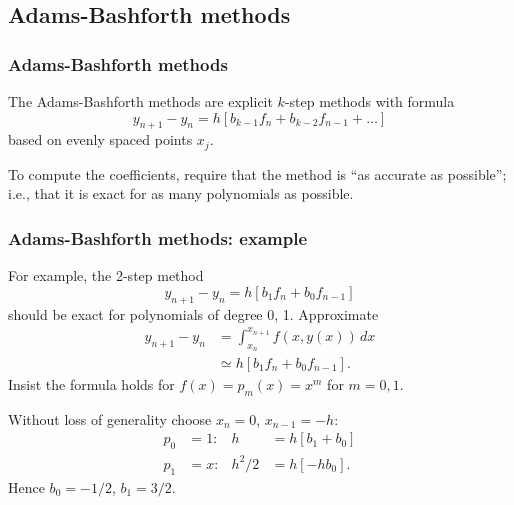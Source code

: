 \documentclass{beamer}
\begin{document}
\subsection{Adams-Bashforth methods}

\begin{frame}
  \frametitle{Adams-Bashforth methods}

  The Adams-Bashforth methods are explicit $k$-step methods
  with formula
  \begin{equation*}
    y_{n+1} - y_n = h \left[ b_{k-1} f_n + b_{k-2} f_{n-1} + \dots \right]
  \end{equation*}
  based on evenly spaced points $x_j$. \pause

  \vspace{1ex}

  To compute the coefficients, require that the method is ``as
  accurate as possible''; i.e., that it is exact for as many
  polynomials as possible.

\end{frame}

\begin{frame}
  \frametitle{Adams-Bashforth methods: example}

  For example, the 2-step method
  \begin{equation*}
    y_{n+1} - y_n = h \left[ b_1 f_n + b_0 f_{n-1} \right]
  \end{equation*}
  should be exact for polynomials of degree 0, 1. Approximate
  \begin{align*}
    y_{n+1} - y_n & = \int_{x_n}^{x_{n+1}} f(x, y(x)) \, dx \\
    & \simeq h \left[ b_1 f_n + b_0 f_{n-1} \right].
  \end{align*} \pause Insist the formula holds for $f(x) = p_m(x) =
  x^m$ for $m = 0, 1$. \pause

  \vspace{1ex}

  Without loss of generality choose $x_n = 0$, $x_{n-1} = -h$:
  \begin{align*}
    p_0 & = 1: & h & = h \left[ b_1 + b_0 \right] \\
    p_1 & = x: & h^2 / 2 & = h \left[ -h b_0 \right].
  \end{align*}
  Hence $b_0 = -1 / 2$, $b_1 = 3 / 2$.

\end{frame}
\end{document}
